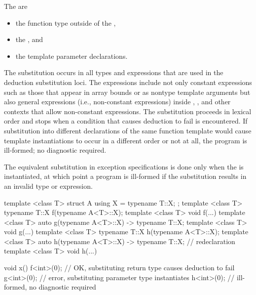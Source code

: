 \pnum
{}%
The  are
\begin{itemize}
\item the function type outside of the ,
\item the , and
\item the template parameter declarations.
\end{itemize}
The substitution occurs in all types and expressions that are used
in the deduction substitution loci.
The expressions include not only
constant expressions such as those that appear in array bounds or as nontype
template arguments but also general expressions (i.e., non-constant expressions)
inside , , and other contexts that allow non-constant
expressions. The substitution proceeds in lexical order and stops when
a condition that causes deduction to fail is encountered.
If substitution into different declarations of the same function template would
cause template instantiations to occur in a different order or not at all,
the program is ill-formed; no diagnostic required.
\begin{note}
The equivalent substitution in exception specifications is
done only when the  is instantiated,
at which point a program is ill-formed
if the substitution results in an invalid type or expression.
\end{note}
\begin{example}
\begin{codeblock}
template <class T> struct A { using X = typename T::X; };
template <class T> typename T::X f(typename A<T>::X);
template <class T> void f(...) { }
template <class T> auto g(typename A<T>::X) -> typename T::X;
template <class T> void g(...) { }
template <class T> typename T::X h(typename A<T>::X);
template <class T> auto h(typename A<T>::X) -> typename T::X;   // redeclaration
template <class T> void h(...) { }

void x() {
  f<int>(0);        // OK, substituting return type causes deduction to fail
  g<int>(0);        // error, substituting parameter type instantiates 
  h<int>(0);        // ill-formed, no diagnostic required
}
\end{codeblock}
\end{example}

